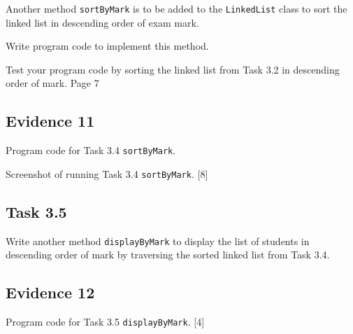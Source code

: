 Another method \texttt{sortByMark} is to be added to the \texttt{LinkedList}
class to sort the linked list in descending order of exam mark.

Write program code to implement this method.

Test your program code by sorting the linked list from Task 3.2 in
descending order of mark. Page 7 

\subsection*{Evidence 11 }

Program code for Task 3.4 \texttt{sortByMark}.

Screenshot of running Task 3.4 \texttt{sortByMark}. \hfill{} {[}8{]}

\subsection*{Task 3.5 }

Write another method \texttt{displayByMark} to display the list of
students in descending order of mark by traversing the sorted linked
list from Task 3.4. 

\subsection*{Evidence 12 }

Program code for Task 3.5 \texttt{displayByMark}. \hfill{}{[}4{]}